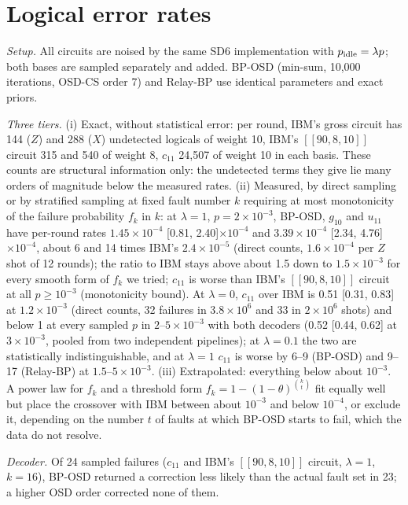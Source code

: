 \documentclass[aps,prl,twocolumn,superscriptaddress,nofootinbib]{revtex4-2}
\newcommand{\code}[1]{[[#1]]}
\begin{document}
\section{Logical error rates}\label{sm:ler}
\emph{Setup.} All circuits are noised by the same SD6 implementation with $p_{\rm
idle}=\lambda p$; both bases are sampled separately and added. BP-OSD (min-sum, 10,000
iterations, OSD-CS order 7) and Relay-BP use identical parameters and exact priors.

\emph{Three tiers.} (i) Exact, without statistical error: per round, IBM's gross circuit has
144 ($Z$) and 288 ($X$) undetected logicals of weight 10, IBM's $\code{90,8,10}$ circuit 315
and 540 of weight 8, $c_{11}$ 24,507 of weight 10 in each basis. These counts are structural
information only: the undetected terms they give lie many orders of magnitude below the
measured rates. (ii) Measured, by direct sampling or by stratified sampling at fixed fault
number $k$ requiring at most monotonicity of the failure probability $f_k$ in $k$: at
$\lambda=1$, $p=2\times10^{-3}$, BP-OSD, $g_{10}$ and $u_{11}$ have per-round rates
$1.45\times10^{-4}$ [0.81, 2.40]$\times10^{-4}$ and $3.39\times10^{-4}$ [2.34,
4.76]$\times10^{-4}$, about 6 and 14 times IBM's $2.4\times10^{-5}$ (direct counts, $1.6\times10^{-4}$ per $Z$ shot of 12 rounds); the ratio to IBM stays above about 1.5 down to
$1.5\times10^{-3}$ for every smooth form of $f_k$ we tried; $c_{11}$ is worse than IBM's
$\code{90,8,10}$ circuit at all $p\ge10^{-3}$ (monotonicity bound). At $\lambda=0$, $c_{11}$
over IBM is 0.51 [0.31, 0.83] at $1.2\times10^{-3}$ (direct counts, 32 failures in
$3.8\times10^6$ and 33 in $2\times10^6$ shots) and below 1 at every sampled $p$ in
$2$--$5\times10^{-3}$ with both decoders (0.52 [0.44, 0.62] at $3\times10^{-3}$, pooled from
two independent pipelines); at $\lambda=0.1$ the two are statistically indistinguishable,
and at $\lambda=1$ $c_{11}$ is worse by 6--9 (BP-OSD) and 9--17 (Relay-BP) at
$1.5$--$5\times10^{-3}$. (iii) Extrapolated: everything below about $10^{-3}$. A power law
for $f_k$ and a threshold form $f_k=1-(1-\theta)^{\binom{k}{t}}$ fit equally well but place
the crossover with IBM between about $10^{-3}$ and below $10^{-4}$, or exclude it, depending
on the number $t$ of faults at which BP-OSD starts to fail, which the data do not resolve.

\emph{Decoder.} Of 24 sampled failures ($c_{11}$ and IBM's $\code{90,8,10}$ circuit,
$\lambda=1$, $k=16$), BP-OSD returned a correction less likely than the actual fault set in
23; a higher OSD order corrected none of them.
\end{document}
